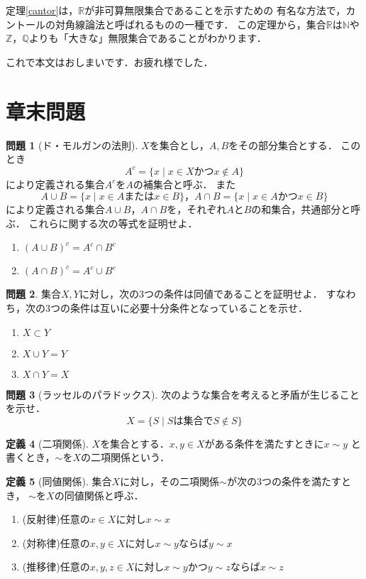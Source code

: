 \documentclass[./main]{subfiles} %
\theoremstyle{definition}
\newtheorem{hamadadefi}{定義}[section]
\newtheorem{hamadaqst}[hamadadefi]{問題}
\begin{document}
定理\ref{cantor}は，$\mathbb{R}$が非可算無限集合であることを示すための
有名な方法で，カントールの対角線論法と呼ばれるものの一種です．
この定理から，集合$\mathbb{R}$は$\mathbb{N}$や
$\mathbb{Z}$，$\mathbb{Q}$よりも「大きな」無限集合であることがわかります．

これで本文はおしまいです．お疲れ様でした．

\section{章末問題}
\begin{hamadaqst}[ド・モルガンの法則]
\label{demorgan}
$X$を集合とし，$A,B$をその部分集合とする．
このとき
\[ A^c=\{x\mid x\in X かつ x\notin A\} \]
により定義される集合$A^c$を$A$の補集合と呼ぶ．
また
\[ A\cup B=\{x\mid x\in A または x\in B\}，A\cap B=\{x\mid x\in A かつ x\in B\} \]
により定義される集合$A\cup B$，$A\cap B$を，それぞれ$A$と$B$の和集合，共通部分と呼ぶ．
これらに関する次の等式を証明せよ．
\begin{enumerate}
\item $(A\cup B)^c=A^c\cap B^c$
\item $(A\cap B)^c=A^c\cup B^c$
\end{enumerate}
\end{hamadaqst}

\begin{hamadaqst}
\label{subsetequiv}
集合$X,Y$に対し，次の3つの条件は同値であることを証明せよ．
すなわち，次の3つの条件は互いに必要十分条件となっていることを示せ．
\begin{enumerate}
\item $X\subset Y$
\item $X\cup Y=Y$
\item $X\cap Y=X$
\end{enumerate}
\end{hamadaqst}

\begin{hamadaqst}[ラッセルのパラドックス]
\label{russel}
次のような集合を考えると矛盾が生じることを示せ．
\[ X=\{S\mid Sは集合でS\notin S\} \]
\end{hamadaqst}

\begin{hamadadefi}[二項関係]
$X$を集合とする．$x,y\in X$がある条件を満たすときに$x\sim y$
と書くとき，$\sim$を$X$の二項関係という．
\end{hamadadefi}

\begin{hamadadefi}[同値関係]
集合$X$に対し，その二項関係$\sim$が次の3つの条件を満たすとき，
$\sim$を$X$の同値関係と呼ぶ．
\begin{enumerate}
\item(反射律)任意の$x\in X$に対し$x\sim x$
\item(対称律)任意の$x,y\in X$に対し$x\sim y$ならば$y\sim x$
\item(推移律)任意の$x,y,z\in X$に対し$x\sim y$かつ$y\sim z$ならば$x\sim z$
\end{enumerate}
\end{hamadadefi}
\end{document}

